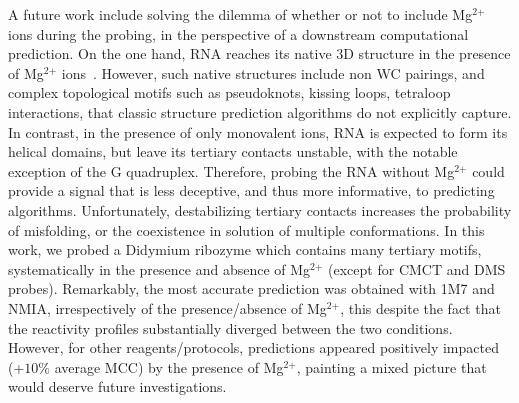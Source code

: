 \documentclass[a4,center,fleqn]{NAR}
\begin{document}
A future work include solving the dilemma of whether or not to include Mg$^{\text{2+}}$ ions during the probing, in the perspective of a downstream computational prediction. On the one hand, RNA reaches its native 3D structure in the presence of Mg$^{\text{2+}}$ ions~\cite{Knapp1989}. However, such native structures include non WC pairings, and complex topological motifs such as pseudoknots, kissing loops, tetraloop interactions, that classic structure prediction algorithms do not explicitly capture. In contrast, in the presence of only monovalent ions, RNA is expected to form its helical domains, but leave its  tertiary contacts unstable, with the notable exception of the G quadruplex. Therefore, probing the RNA without Mg$^{\text{2+}}$ could provide a signal that is less deceptive, and thus more informative, to predicting algorithms. Unfortunately, destabilizing tertiary contacts increases the probability of misfolding, or the coexistence in solution of multiple conformations. In this work, we probed a Didymium ribozyme which contains many tertiary motifs, systematically in the presence and absence of Mg$^{\text{2+}}$ (except for CMCT and DMS probes). Remarkably, the most accurate prediction was obtained with 1M7 and NMIA, irrespectively of the presence/absence of Mg$^{\text{2+}}$, this despite the fact that the reactivity profiles substantially diverged between the two conditions. However, for other reagents/protocols, predictions appeared positively impacted (+$10\%$ average MCC) by the presence of Mg$^{\text{2+}}$, painting a mixed picture that would deserve future investigations.
\end{document}
